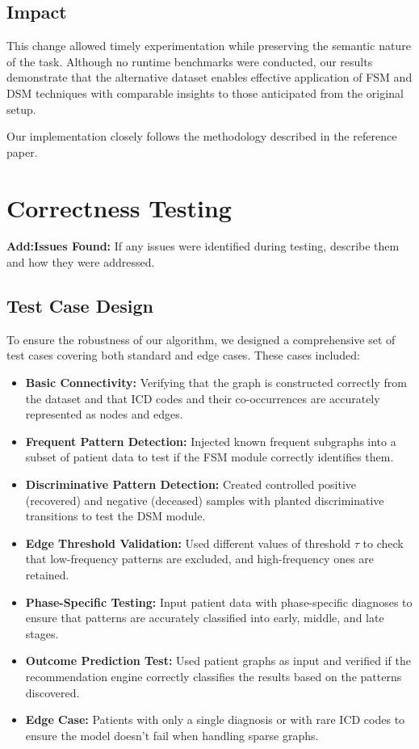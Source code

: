 \documentclass[11pt]{article}
\begin{document}
\subsection*{Impact}
This change allowed timely experimentation while preserving the semantic nature of the task. Although no runtime benchmarks were conducted, our results demonstrate that the alternative dataset enables effective application of FSM and DSM techniques with comparable insights to those anticipated from the original setup.

Our implementation closely follows the methodology described in the reference paper.


\section{Correctness Testing}
 \textbf{Add:Issues Found:} If any issues were identified during testing, describe them and how they were addressed.
\subsection{Test Case Design}

To ensure the robustness of our algorithm, we designed a comprehensive set of test cases covering both standard and edge cases. These cases included:

\begin{itemize}
    \item \textbf{Basic Connectivity:} Verifying that the graph is constructed correctly from the dataset and that ICD codes and their co-occurrences are accurately represented as nodes and edges.
    \item \textbf{Frequent Pattern Detection:} Injected known frequent subgraphs into a subset of patient data to test if the FSM module correctly identifies them.
    \item \textbf{Discriminative Pattern Detection:} Created controlled positive (recovered) and negative (deceased) samples with planted discriminative transitions to test the DSM module.
    \item \textbf{Edge Threshold Validation:} Used different values of threshold $\tau$ to check that low-frequency patterns are excluded, and high-frequency ones are retained.
    \item \textbf{Phase-Specific Testing:} Input patient data with phase-specific diagnoses to ensure that patterns are accurately classified into early, middle, and late stages.
    \item \textbf{Outcome Prediction Test:} Used patient graphs as input and verified if the recommendation engine correctly classifies the results based on the patterns discovered.
    \item \textbf{Edge Case:} Patients with only a single diagnosis or with rare ICD codes to ensure the model doesn’t fail when handling sparse graphs.
\end{itemize}     
\end{document}
